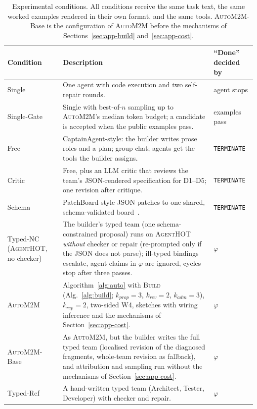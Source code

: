 \documentclass[pdflatex,sn-mathphys-num]{sn-jnl}
\theoremstyle{thmstyleone}%
\theoremstyle{thmstyletwo}%
\theoremstyle{thmstylethree}%
\newcommand{\tool}{\textsc{AgentHOT}}
\newcommand{\auto}{\textsc{AutoM2M}}
\newcommand{\W}[1]{\textsf{W#1}}
\newcommand{\D}[1]{\textsf{D#1}}
\newcommand{\code}[1]{\texttt{#1}}
\begin{document}
\begin{table}[t]
\centering\small
\caption{Experimental conditions. All conditions receive the same task text,
the same worked examples rendered in their own format, and the same tools.
\auto{}-Base is the configuration of \auto{} before the mechanisms of
Sections~\ref{sec:app-build} and~\ref{sec:app-cost}.}
\label{tab:conditions}
\setlength{\tabcolsep}{4pt}
\begin{tabularx}{\textwidth}{@{}l X l@{}}
\toprule
Condition & Description & ``Done'' decided by \\
\midrule
Single & One agent with code execution and two self-repair rounds. & agent stops \\
Single-Gate & Single with best-of-$n$ sampling up to \auto{}'s median token budget; a candidate is accepted when the public examples pass. & examples pass \\
Free & CaptainAgent-style: the builder writes prose roles and a plan; group chat; agents get the tools the builder assigns. & \code{TERMINATE} \\
Critic & Free, plus an LLM critic that reviews the team's JSON-rendered specification for \D{1}--\D{5}; one revision after critique. & \code{TERMINATE} \\
Schema & PatchBoard-style JSON patches to one shared, schema-validated board~\cite{zhang2026patchboard}. & \code{TERMINATE} \\
Typed-NC (\tool{}, no checker) & The builder's typed team (one schema-constrained proposal) runs on \tool{} \emph{without} checker or repair (re-prompted only if the JSON does not parse); ill-typed bindings escalate, agent claims in $\varphi$ are ignored, cycles stop after three passes. & $\varphi$ \\
\auto{} & Algorithm~\ref{alg:auto} with \textsc{Build} (Alg.~\ref{alg:build}; $k_{\mathit{prop}}=3$, $k_{\mathit{rev}}=2$, $k_{\mathit{adm}}=3$), $k_{\mathit{rep}}=2$, two-sided \W{4}, sketches with wiring inference and the mechanisms of Section~\ref{sec:app-cost}. & $\varphi$ \\
\auto{}-Base & As \auto{}, but the builder writes the full typed team (localised revision of the diagnosed fragments, whole-team revision as fallback), and attribution and sampling run without the mechanisms of Section~\ref{sec:app-cost}. & $\varphi$ \\
Typed-Ref & A hand-written typed team (Architect, Tester, Developer) with checker and repair. & $\varphi$ \\
\bottomrule
\end{tabularx}
\end{table}
\end{document}
